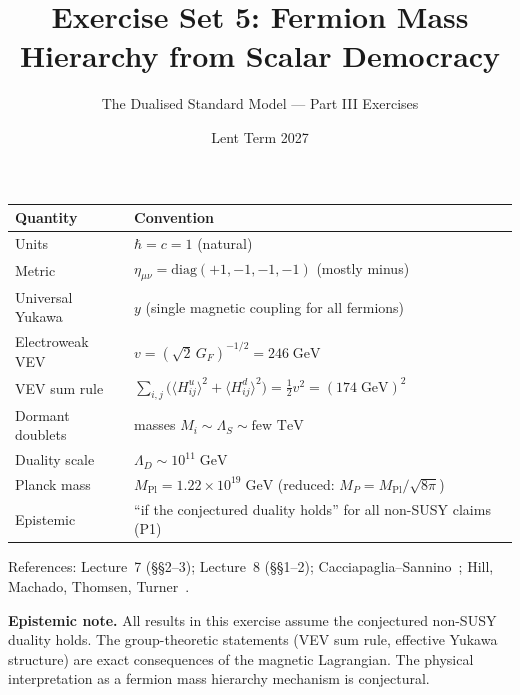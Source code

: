 \documentclass[11pt,a4paper]{article}
\title{\textbf{Exercise Set 5: Fermion Mass Hierarchy from Scalar Democracy}}
\author{The Dualised Standard Model --- Part III Exercises}
\date{Lent Term 2027}
\begin{document}
\maketitle

\begin{conventionbox}[title={Conventions for these exercises}]
\renewcommand{\arraystretch}{1.3}
\begin{tabular}{@{}l l@{}}
\toprule
\textbf{Quantity} & \textbf{Convention} \\
\midrule
Units & $\hbar = c = 1$ (natural) \\
Metric & $\eta_{\mu\nu} = \mathrm{diag}(+1,-1,-1,-1)$ (mostly minus) \\
Universal Yukawa & $y$ (single magnetic coupling for all fermions) \\
Electroweak VEV & $v = (\sqrt{2}\,G_F)^{-1/2} = 246\;\text{GeV}$ \\
VEV sum rule & $\sum_{i,j}\bigl(\langle H_{ij}^u\rangle^2
  + \langle H_{ij}^d\rangle^2\bigr) = \tfrac{1}{2}v^2 = (174\;\text{GeV})^2$ \\
Dormant doublets & masses $M_i \sim \Lambda_S \sim \text{few TeV}$ \\
Duality scale & $\Lambda_D \sim 10^{11}\;\text{GeV}$ \\
Planck mass & $M_{\text{Pl}} = 1.22 \times 10^{19}\;\text{GeV}$ (reduced: $M_P = M_{\text{Pl}}/\sqrt{8\pi}$) \\
Epistemic & ``if the conjectured duality holds'' for all non-SUSY claims (P1) \\
\bottomrule
\end{tabular}

\medskip

\noindent References: Lecture~7 (\S\S2--3); Lecture~8 (\S\S1--2);
Cacciapaglia--Sannino~\cite{CacciapagliaSannino2024};
Hill, Machado, Thomsen, Turner~\cite{HillMachado2019}.

\medskip

\noindent\textbf{Epistemic note.}
All results in this exercise assume the conjectured non-SUSY
duality holds.  The group-theoretic statements (VEV sum rule,
effective Yukawa structure) are exact consequences of the magnetic
Lagrangian.  The physical interpretation as a fermion mass hierarchy
mechanism is conjectural.
\end{conventionbox}

\bigskip


\end{document}
